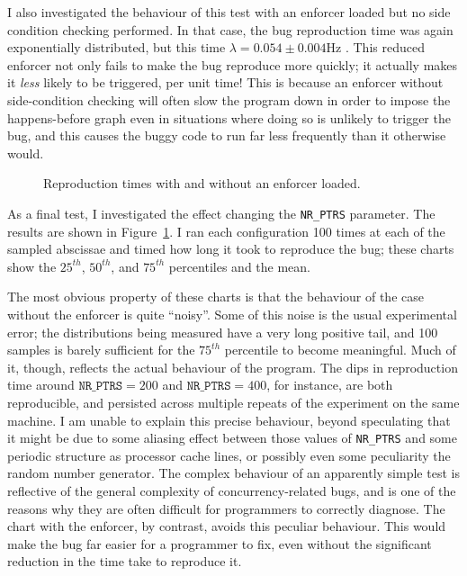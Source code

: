 I also investigated the behaviour of this test with an enforcer loaded
but no side condition checking performed.  In that case, the bug
reproduction time was again exponentially distributed, but this time
$\lambda = 0.054 \pm 0.004$Hz .  This reduced enforcer not only fails to make the bug
reproduce more quickly; it actually makes it \emph{less} likely to be
triggered, per unit time!  This is because an enforcer without
side-condition checking will often slow the program down in order to
impose the happens-before graph even in situations where doing so is
unlikely to trigger the bug, and this causes the buggy code to run far
less frequently than it otherwise would.

\begin{figure}
  \caption{Reproduction times with and without an enforcer loaded.}
  \label{fig:eval:indexed_toctou:nr_ptrs}
\end{figure}

As a final test, I investigated the effect changing the
\texttt{NR\_PTRS} parameter.  The results are shown in
Figure~\ref{fig:eval:indexed_toctou:nr_ptrs}.  I ran each
configuration 100 times at each of the sampled abscissae and timed how
long it took to reproduce the bug; these charts show the $25^{th}$,
$50^{th}$, and $75^{th}$ percentiles and the mean.

The most obvious property of these charts is that the behaviour of the
case without the enforcer is quite ``noisy''.  Some of this noise is
the usual experimental error; the distributions being measured have a
very long positive tail, and 100 samples is barely sufficient for the
$75^{th}$ percentile to become meaningful.  Much of it, though,
reflects the actual behaviour of the program.  The dips in
reproduction time around $\texttt{NR\_PTRS} = 200$ and
$\texttt{NR\_PTRS} = 400$, for instance, are both reproducible, and
persisted across multiple repeats of the experiment on the same
machine.  I am unable to explain this precise behaviour, beyond
speculating that it might be due to some aliasing effect between those
values of \texttt{NR\_PTRS} and some periodic structure as processor
cache lines, or possibly even some peculiarity the random number
generator.  The complex behaviour of an apparently simple test is
reflective of the general complexity of concurrency-related bugs, and
is one of the reasons why they are often difficult for programmers to
correctly diagnose\needCite{}.  The chart with the enforcer, by
contrast, avoids this peculiar behaviour.  This would make the bug far
easier for a programmer to fix, even without the significant reduction
in the time take to reproduce it.

